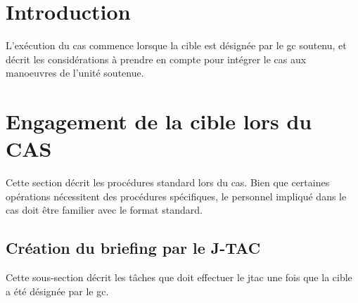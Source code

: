 %
%

\section{Introduction}

L'exécution du \gls{cas} commence lorsque la cible est désignée par le \gls{gc} soutenu, et décrit les considérations à prendre en compte pour intégrer le \gls{cas} aux manoeuvres de l'unité soutenue.

\section{Engagement de la cible lors du CAS}

Cette section décrit les procédures standard lors du \gls{cas}. Bien que certaines opérations nécessitent des procédures spécifiques, le personnel impliqué dans le \gls{cas} doit être familier avec le format standard.

\subsection{Création du briefing par le J-TAC}
Cette sous-section décrit les tâches que doit effectuer le \gls{jtac} une fois que la cible a été désignée par le \gls{gc}.

